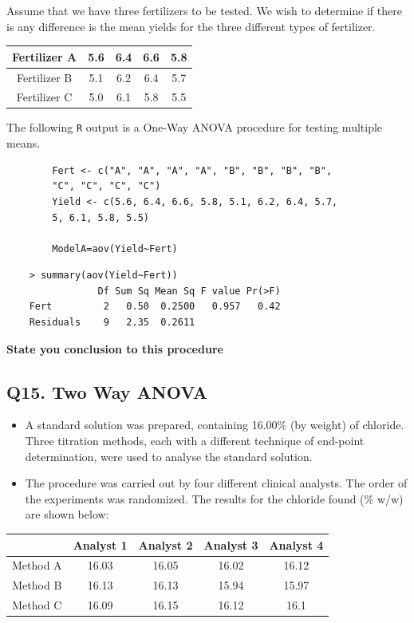 \documentclass[a4paper,12pt]{article}
\begin{document}
	Assume that we have three fertilizers to be tested. We wish to determine if there is any difference is the mean yields for the three different types of fertilizer.
	\begin{center}
		\begin{tabular}{|c|c|c|c|c|}
			\hline
			Fertilizer	A	&	5.6	&	6.4	&	6.6	&	5.8	\\ \hline
			Fertilizer	B	&	5.1	&	6.2	&	6.4	&	5.7	\\ \hline
			Fertilizer	C	&	5.0	&	6.1	&	5.8	&	5.5	\\ \hline
		\end{tabular} 
	\end{center}
	The following \texttt{R} output is a One-Way ANOVA procedure for testing multiple means.
	
	\begin{framed}
		\begin{verbatim}
		Fert <- c("A", "A", "A", "A", "B", "B", "B", "B", 
		"C", "C", "C", "C")
		Yield <- c(5.6, 6.4, 6.6, 5.8, 5.1, 6.2, 6.4, 5.7, 
		5, 6.1, 5.8, 5.5)
		
		ModelA=aov(Yield~Fert)
		\end{verbatim}
	\end{framed}
	\begin{verbatim}
	> summary(aov(Yield~Fert))
	            Df Sum Sq Mean Sq F value Pr(>F)
	Fert         2   0.50  0.2500   0.957   0.42
	Residuals    9   2.35  0.2611 
	\end{verbatim}
	
\textbf{State you conclusion to this procedure}
\subsection*{Q15. Two Way ANOVA } 
\begin{itemize}
	\item A standard solution was prepared, containing 16.00\% (by weight) of chloride. Three titration methods, each with a different technique of end-point determination, were used to analyse the standard solution.
	\item The procedure was carried out by four different clinical analysts. The order of the experiments was randomized. The results for the chloride found (\% w/w) are shown below:
	
\end{itemize}

\begin{center}
	\begin{tabular}{|c|c|c|c|c|}
		\hline 	& Analyst 1	&Analyst 2	&Analyst 3	&Analyst 4	\\ \hline
		Method A	&	16.03	&	16.05	&	16.02	&	16.12	\\ \hline
		Method B	&	16.13	&	16.13	&	15.94	&	15.97	\\ \hline
		Method C	&	16.09	&	16.15	&	16.12	&	16.1	\\ \hline
	\end{tabular}
\end{center}
\end{document}
